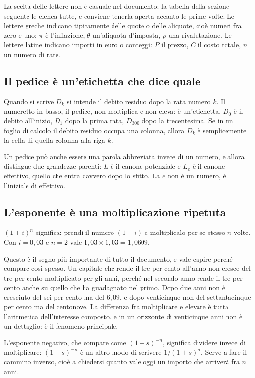 \documentclass[11pt,a4paper]{article}
\theoremstyle{definition}
\theoremstyle{plain}
\begin{document}
La scelta delle lettere non è casuale nel documento: la tabella della sezione seguente le elenca tutte, e conviene tenerla aperta accanto le prime volte. Le lettere greche indicano tipicamente delle quote o delle aliquote, cioè numeri fra zero e uno: $\pi$ è l'inflazione, $\theta$ un'aliquota d'imposta, $\rho$ una rivalutazione. Le lettere latine indicano importi in euro o conteggi: $P$ il prezzo, $C$ il costo totale, $n$ un numero di rate.

\subsection{Il pedice è un'etichetta che dice quale}

Quando si scrive $D_k$ si intende il debito residuo dopo la rata numero $k$. Il numeretto in basso, il pedice, non moltiplica e non eleva: è un'etichetta. $D_0$ è il debito all'inizio, $D_1$ dopo la prima rata, $D_{300}$ dopo la trecentesima. Se in un foglio di calcolo il debito residuo occupa una colonna, allora $D_k$ è semplicemente la cella di quella colonna alla riga $k$.

Un pedice può anche essere una parola abbreviata invece di un numero, e allora distingue due grandezze parenti: $L$ è il canone potenziale e $L_e$ è il canone effettivo, quello che entra davvero dopo lo sfitto. La $e$ non è un numero, è l'iniziale di effettivo.

\subsection{L'esponente è una moltiplicazione ripetuta}

$(1+i)^n$ significa: prendi il numero $(1+i)$ e moltiplicalo per se stesso $n$ volte. Con $i = 0{,}03$ e $n = 2$ vale $1{,}03 \times 1{,}03 = 1{,}0609$.

Questo è il segno più importante di tutto il documento, e vale capire perché compare così spesso. Un capitale che rende il tre per cento all'anno non cresce del tre per cento moltiplicato per gli anni, perché nel secondo anno rende il tre per cento anche su quello che ha guadagnato nel primo. Dopo due anni non è cresciuto del sei per cento ma del $6{,}09$, e dopo venticinque non del settantacinque per cento ma del centonove. La differenza fra moltiplicare e elevare è tutta l'aritmetica dell'interesse composto, e in un orizzonte di venticinque anni non è un dettaglio: è il fenomeno principale.

L'esponente negativo, che compare come $(1+s)^{-n}$, significa dividere invece di moltiplicare: $(1+s)^{-n}$ è un altro modo di scrivere $1/(1+s)^n$. Serve a fare il cammino inverso, cioè a chiedersi quanto vale oggi un importo che arriverà fra $n$ anni.
\end{document}
